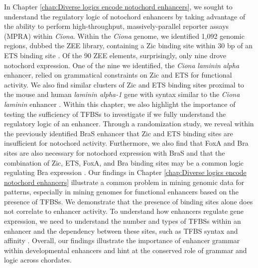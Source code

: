 \begin{dissertationepilogue}
    In Chapter \ref{chap:Diverse logics encode notochord enhancers}, we sought to understand the regulatory logic of notochord enhancers by taking advantage of the ability to perform high-throughput, massively-parallel reporter assays (MPRA) within \textit{Ciona}. Within the \textit{Ciona} genome, we identified 1,092 genomic regions, dubbed the ZEE library, containing a Zic binding site within 30 bp of an ETS binding site \cite{song2022}. Of the 90 ZEE elements, surprisingly, only nine drove notochord expression. One of the nine we identified, the \textit{Ciona} \textit{laminin alpha} enhancer, relied on grammatical constraints on Zic and ETS for functional activity. We also find similar clusters of Zic and ETS binding sites proximal to the mouse and human \textit{laminin alpha-1} gene with syntax similar to the \textit{Ciona laminin} enhancer \cite{song2022}. Within this chapter, we also highlight the importance of testing the sufficiency of TFBSs to investigate if we fully understand the regulatory logic of an enhancer. Through a randomization study, we reveal within the previously identified BraS enhancer that Zic and ETS binding sites are insufficient for notochord activity. Furthermore, we also find that FoxA and Bra sites are also necessary for notochord expression with BraS and that the combination of Zic, ETS, FoxA, and Bra binding sites may be a common logic regulating Bra expression \cite{song2022}. Our findings in Chapter \ref{chap:Diverse logics encode notochord enhancers} illustrate a common problem in mining genomic data for patterns, especially in mining genomes for functional enhancers based on the presence of TFBSs. We demonstrate that the presence of binding sites alone does not correlate to enhancer activity. To understand how enhancers regulate gene expression, we need to understand the number and types of TFBSs within an enhancer and the dependency between these sites, such as TFBS syntax and affinity \cite{jindal2021}. Overall, our findings illustrate the importance of enhancer grammar within developmental enhancers and hint at the conserved role of grammar and logic across chordates. 


\end{dissertationepilogue}
